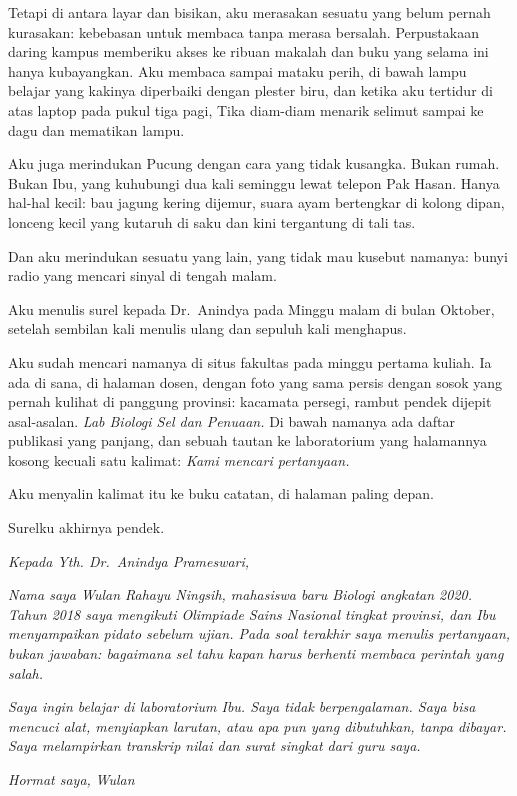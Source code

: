 \documentclass[11pt,twoside,openany]{book}
\makeatletter
\newcommand{\scenebreak}{\par\vspace{0.9em}{\centering\textsc{*\hspace{0.7em}*\hspace{0.7em}*}\par}\vspace{0.9em}\@afterindentfalse\@afterheading}
\makeatother
\begin{document}
Tetapi di antara layar dan bisikan, aku merasakan sesuatu yang belum pernah kurasakan: kebebasan untuk membaca tanpa merasa bersalah. Perpustakaan daring kampus memberiku akses ke ribuan makalah dan buku yang selama ini hanya kubayangkan. Aku membaca sampai mataku perih, di bawah lampu belajar yang kakinya diperbaiki dengan plester biru, dan ketika aku tertidur di atas laptop pada pukul tiga pagi, Tika diam-diam menarik selimut sampai ke dagu dan mematikan lampu.

Aku juga merindukan Pucung dengan cara yang tidak kusangka. Bukan rumah. Bukan Ibu, yang kuhubungi dua kali seminggu lewat telepon Pak Hasan. Hanya hal-hal kecil: bau jagung kering dijemur, suara ayam bertengkar di kolong dipan, lonceng kecil yang kutaruh di saku dan kini tergantung di tali tas.

Dan aku merindukan sesuatu yang lain, yang tidak mau kusebut namanya: bunyi radio yang mencari sinyal di tengah malam.

\scenebreak
Aku menulis surel kepada Dr.~Anindya pada Minggu malam di bulan Oktober, setelah sembilan kali menulis ulang dan sepuluh kali menghapus.

Aku sudah mencari namanya di situs fakultas pada minggu pertama kuliah. Ia ada di sana, di halaman dosen, dengan foto yang sama persis dengan sosok yang pernah kulihat di panggung provinsi: kacamata persegi, rambut pendek dijepit asal-asalan. \emph{Lab Biologi Sel dan Penuaan.} Di bawah namanya ada daftar publikasi yang panjang, dan sebuah tautan ke laboratorium yang halamannya kosong kecuali satu kalimat: \emph{Kami mencari pertanyaan.}

Aku menyalin kalimat itu ke buku catatan, di halaman paling depan.

Surelku akhirnya pendek.

\emph{Kepada Yth. Dr.~Anindya Prameswari,}

\emph{Nama saya Wulan Rahayu Ningsih, mahasiswa baru Biologi angkatan 2020. Tahun 2018 saya mengikuti Olimpiade Sains Nasional tingkat provinsi, dan Ibu menyampaikan pidato sebelum ujian. Pada soal terakhir saya menulis pertanyaan, bukan jawaban: bagaimana sel tahu kapan harus berhenti membaca perintah yang salah.}

\emph{Saya ingin belajar di laboratorium Ibu. Saya tidak berpengalaman. Saya bisa mencuci alat, menyiapkan larutan, atau apa pun yang dibutuhkan, tanpa dibayar. Saya melampirkan transkrip nilai dan surat singkat dari guru saya.}

\emph{Hormat saya,} \emph{Wulan}
\end{document}
